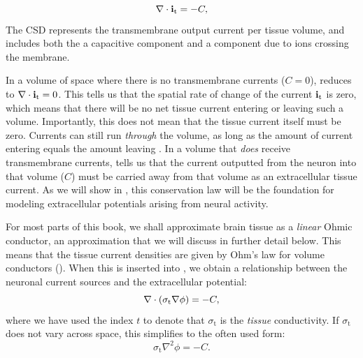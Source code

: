 \begin{equation}
{\bf \nabla} \cdot {\bf i}_\text{t} = -C,
\label{eq:Basics:continuity1}
\end{equation}
The CSD represents the transmembrane output current per tissue volume, and includes both the a capacitive component and a component due to ions crossing the membrane. 

In a volume of space where there is no transmembrane currents ($C = 0$),  reduces to ${\bf \nabla} \cdot {\bf i}_\text{t} = 0$. This tells us that the spatial rate of change of the current ${\bf i}_\text{t}$ is zero, which means that there will be no net tissue current entering or leaving such a volume. Importantly, this does not mean that the tissue current itself must be zero. Currents can still run \textit{through} the volume, as long as the amount of current entering equals the amount leaving . In a volume that \textit{does} receive transmembrane currents,  tells us that the current outputted from the neuron into that volume ($C$) must be carried away from that volume as an extracellular tissue current. As we will show in , this conservation law will be the foundation for modeling extracellular potentials arising from neural activity.

For most parts of this book, we shall approximate brain tissue as a \textit{linear} Ohmic conductor, an approximation that we will discuss in further detail below. This means that the tissue current densities are given by Ohm's law for volume conductors (). When this is inserted into , we obtain a relationship between the neuronal current sources and the extracellular potential:
\begin{equation}
{\bf \nabla} \cdot \left(\sigma_\text{t} {\bf \nabla} {\phi} \right) = -C,
\label{eq:Basics:continuity2}
\end{equation}
where we have used the index $t$ to denote that $\sigma_\text{t}$ is the \textit{tissue} conductivity. If $\sigma_\text{t}$ does not vary across space, this simplifies to the often used form:
\begin{equation}
\sigma_\text{t} \nabla^2{\phi} = -C.
\label{eq:Basics:continuity3}
\end{equation}

